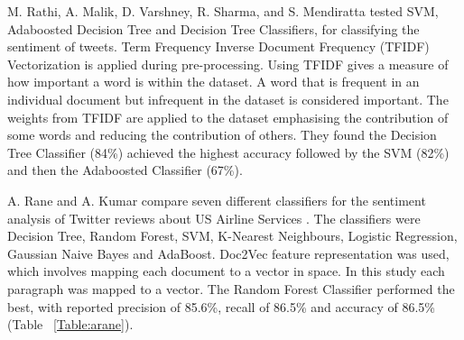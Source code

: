 M. Rathi, A. Malik, D. Varshney, R. Sharma, and S. Mendiratta \cite{Raithi2018} tested SVM, Adaboosted Decision Tree and Decision Tree Classifiers, for classifying the sentiment of tweets. Term Frequency Inverse Document Frequency (TFIDF) Vectorization is applied during pre-processing. Using TFIDF gives a measure of how important a word is within the dataset. A word that is frequent in an individual document but infrequent in the dataset is considered important. The weights from TFIDF are applied to the dataset emphasising the contribution of some words and reducing the contribution of others. They found the Decision Tree Classifier (84\%) achieved the highest accuracy followed by the SVM (82\%) and then the Adaboosted Classifier (67\%).

\begin{table}[h!]
\centering
\caption{Precision, Accuracy and Recall of the classifiers from the study by A. Rane and A. Kumar \cite{Rane2018}.}
\label{Table:arane}
\setlength\extrarowheight{5pt}
\end{table}

A. Rane and A. Kumar compare seven different classifiers for the sentiment analysis of Twitter reviews about US Airline Services \cite{Rane2018}. The classifiers were Decision Tree, Random Forest, SVM, K-Nearest Neighbours, Logistic Regression, Gaussian Naive Bayes and AdaBoost. Doc2Vec feature representation was used, which involves mapping each document to a vector in space. In this study each paragraph was mapped to a vector. The Random Forest Classifier performed the best, with reported precision of 85.6\%, recall of 86.5\% and accuracy of 86.5\% (Table ~\ref{Table:arane}). 

